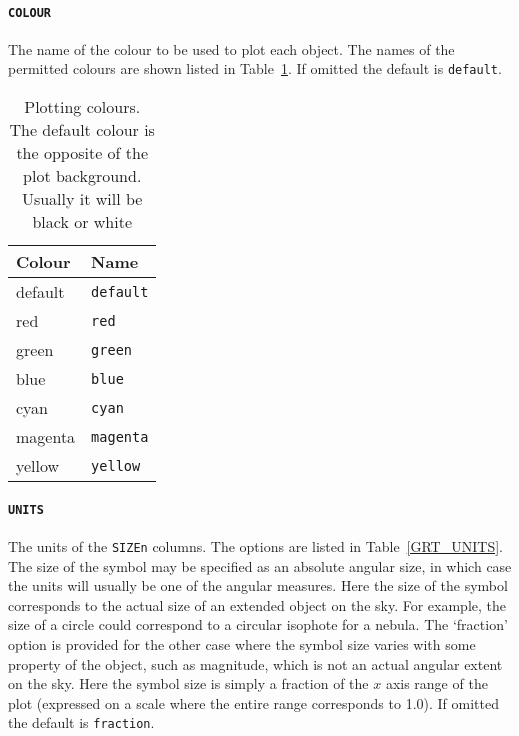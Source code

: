 \documentclass[twoside,11pt]{starlink}
\begin{document}
\paragraph{\texttt{COLOUR}} The name of the colour to be used to plot
each object.  The names of the permitted colours are shown listed in
Table~\ref{GRT_COLOUR}.  If omitted the default is \texttt{default}.

\begin{table}[htbp]

\begin{center}
\begin{tabular}{ll}
Colour   & Name \\ \hline
default  & \texttt{default}  \\
red      & \texttt{red}      \\
green    & \texttt{green}    \\
blue     & \texttt{blue}     \\
cyan     & \texttt{cyan}     \\
magenta  & \texttt{magenta}  \\
yellow   & \texttt{yellow}   \\
\end{tabular}
\end{center}

\begin{quote}
\caption[Plotting colours]{Plotting colours.  The default colour is the
opposite of the plot background.  Usually it will be black or white
\label{GRT_COLOUR} }
\end{quote}

\end{table}

\paragraph{\texttt{UNITS}} The units of the \texttt{SIZEn} columns.  The options
are listed in Table~\ref{GRT_UNITS}.  The size of the symbol may be
specified as an absolute angular size, in which case the units will
usually be one of the angular measures.  Here the size of the symbol
corresponds to the actual size of an extended object on the sky.  For
example, the size of a circle could correspond to a circular isophote for
a nebula.  The `fraction' option is provided for the other case where the
symbol size varies with some property of the object, such as magnitude,
which is not an actual angular extent on the sky.  Here the symbol size is
simply a fraction of the $x$\/ axis range of the plot (expressed on a scale
where the entire range corresponds to 1.0).  If omitted the default is \texttt{fraction}.
\end{document}
